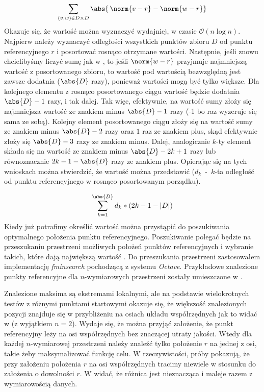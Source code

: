 \begin{equation}
	\sum_{(v,w) \in D \times D}\abs{\,\norm{v-r} - \norm{w-r}}
	\label{ti:cartesian-sum}
\end{equation}
Okazuje się, że wartość  można wyznaczyć wydajniej, w czasie $ \mathcal{O}(n\log{n}) $. Najpierw należy wyznaczyć odległości wszystkich punktów zbioru $ D $ od punktu referencyjnego $ r $ i posortować rosnąco otrzymane wartości. Następnie, jeśli znowu chcielibyśmy liczyć sumę jak w , to jeśli $ \norm{w-r} $ przyjmuje najmniejszą wartość z posortowanego zbioru, to wartość pod wartością bezwzględną jest zawsze dodatnia ($ \abs{D} $ razy), ponieważ wartości  mogą być tylko większe. Dla kolejnego elementu z rosnąco posortowanego ciągu wartość będzie dodatnia $ \abs{D}-1 $ razy, i tak dalej. Tak więc, efektywnie, na wartość sumy złoży się najmniejsza wartość ze znakiem minus $ \abs{D}-1 $ razy (-1 bo raz wyzeruje się sama ze sobą). Kolejny element posortowanego ciągu złoży się na wartość sumy ze znakiem minus $ \abs{D}-2 $ razy oraz $ 1 $ raz ze znakiem plus, skąd efektywnie złoży się $ \abs{D}-3 $ razy ze znakiem minus. Dalej, analogicznie $ k $-ty element składa się na wartość  ze znakiem minus $ \abs{D} - 2k + 1 $ razy lub równoznacznie $ 2k-1-\abs{D} $ razy ze znakiem plus. Opierając się na tych wnioskach można stwierdzić, że wartość  można przedstawić  (\mbox{$ d_k $ - $ k $-ta} odległość od punktu referencyjnego w rosnąco posortowanym porządku).

\begin{equation}
	\sum_{k=1}^{\abs{D}}d_k*(2k-1-|D|)
	\label{ti:eff-max-ti-d}
\end{equation}
Kiedy już potrafimy określić wartość  można przystąpić do poszukiwania optymalnego położenia punktu referencyjnego. Poszukiwanie polegać będzie na przeszukaniu przestrzeni możliwych położeń punktów referencyjnych i wybranie takich, które dają największą wartość . Do przeszukania przestrzeni zastosowałem implementację \textit{fminsearch} pochodzącą z systemu \textit{Octave}. Przykładowe znalezione punkty referencyjne dla $ n $-wymiarowych przestrzeni zostały umieszczone w .

Znalezione maksima są ekstremami lokalnymi, ale na podstawie wielokrotnych testów z różnymi punktami startowymi okazuje się, że większość znalezionych pozycji znajduje się w przybliżeniu na osiach układu współrzędnych jak to widać w  (z wyjątkiem $ n=2 $). Wydaje się, że można przyjąć założenie, że punkt referencyjny leży na osi współrzędnych bez znaczącej utraty jakości. Wtedy dla każdej $ n $-wymiarowej przestrzeni należy znaleźć tylko położenie $ r $ na jednej z osi, takie żeby maksymalizować funkcję celu. W rzeczywistości, próby pokazują, że przy założeniu położenia $ r $ na osi współrzędnych tracimy niewiele w stosunku do założenia o dowolności $ r $. W  widać, że różnica jest nieznacząca i maleje razem z wymiarowością danych.

